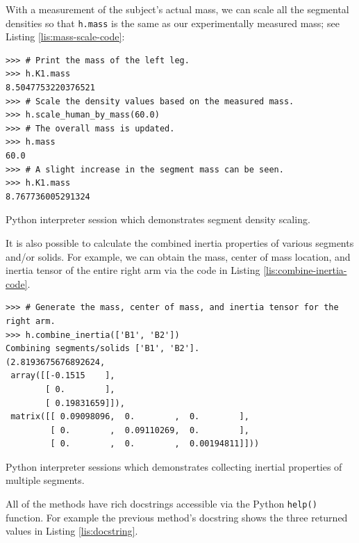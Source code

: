 \documentclass[10pt,a4paper,twocolumn]{article}
\begin{document}
With a measurement of the subject's actual mass, we can scale all the segmental
densities so that \verb+h.mass+ is the same as our experimentally measured
mass; see Listing \ref{lis:mass-scale-code}:

\begin{listing*}
  \begin{verbatim}
>>> # Print the mass of the left leg.
>>> h.K1.mass
8.5047753220376521
>>> # Scale the density values based on the measured mass.
>>> h.scale_human_by_mass(60.0)
>>> # The overall mass is updated.
>>> h.mass
60.0
>>> # A slight increase in the segment mass can be seen.
>>> h.K1.mass
8.767736005291324
  \end{verbatim}
  \caption{Python interpreter session which demonstrates segment density
    scaling.}
  \label{lis:mass-scale-code}
\end{listing*}

It is also possible to calculate the combined inertia properties of various
segments and/or solids. For example, we can obtain the mass, center of mass
location, and inertia tensor of the entire right arm via the code in Listing
\ref{lis:combine-inertia-code}.

\begin{listing*}
  \begin{verbatim}
>>> # Generate the mass, center of mass, and inertia tensor for the right arm.
>>> h.combine_inertia(['B1', 'B2'])
Combining segments/solids ['B1', 'B2'].
(2.8193675676892624,
 array([[-0.1515    ],
        [ 0.        ],
        [ 0.19831659]]),
 matrix([[ 0.09098096,  0.        ,  0.        ],
         [ 0.        ,  0.09110269,  0.        ],
         [ 0.        ,  0.        ,  0.00194811]]))
  \end{verbatim}
  \caption{Python interpreter sessions which demonstrates collecting inertial
    properties of multiple segments.}
  \label{lis:combine-inertia-code}
\end{listing*}

All of the methods have rich docstrings accessible via the Python \verb+help()+
function. For example the previous method's docstring shows the three returned
values in Listing \ref{lis:docstring}.
\end{document}
